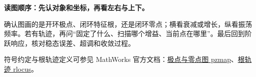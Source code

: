 \documentclass[UTF8,a4paper,11pt,fontset=windows]{ctexart}
\begin{document}
\begin{keybox}
\textbf{读图顺序：先认对象和坐标，再看左右与上下。}

确认图画的是开环极点、闭环特征根，还是闭环零点；横看衰减或增长，纵看振荡频率。若有轨迹，再问“固定了什么、扫描哪个增益、当前点在哪里”。最后回到阶跃响应，核对稳态误差、超调和收敛过程。
\end{keybox}

符号约定与根轨迹定义可参见 MathWorks 官方文档：\href{https://www.mathworks.com/help/control/ref/lti.pzmap.html}{极点与零点图 pzmap}、\href{https://www.mathworks.com/help/control/ref/dynamicsystem.rlocus.html}{根轨迹 rlocus}。
\end{document}

